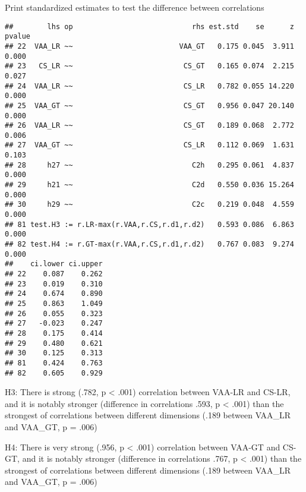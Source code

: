 \documentclass[
]{article}
\newenvironment{Shaded}{\begin{snugshade}}{\end{snugshade}}
\newcommand{\KeywordTok}[1]{\textcolor[rgb]{0.13,0.29,0.53}{\textbf{#1}}}
\newcommand{\NormalTok}[1]{#1}
\newcommand{\OperatorTok}[1]{\textcolor[rgb]{0.81,0.36,0.00}{\textbf{#1}}}
\newcommand{\StringTok}[1]{\textcolor[rgb]{0.31,0.60,0.02}{#1}}
\begin{document}
Print standardized estimates to test the difference between correlations

\begin{Shaded}
\end{Shaded}

\begin{verbatim}
##        lhs op                            rhs est.std    se      z pvalue
## 22  VAA_LR ~~                         VAA_GT   0.175 0.045  3.911  0.000
## 23   CS_LR ~~                          CS_GT   0.165 0.074  2.215  0.027
## 24  VAA_LR ~~                          CS_LR   0.782 0.055 14.220  0.000
## 25  VAA_GT ~~                          CS_GT   0.956 0.047 20.140  0.000
## 26  VAA_LR ~~                          CS_GT   0.189 0.068  2.772  0.006
## 27  VAA_GT ~~                          CS_LR   0.112 0.069  1.631  0.103
## 28     h27 ~~                            C2h   0.295 0.061  4.837  0.000
## 29     h21 ~~                            C2d   0.550 0.036 15.264  0.000
## 30     h29 ~~                            C2c   0.219 0.048  4.559  0.000
## 81 test.H3 := r.LR-max(r.VAA,r.CS,r.d1,r.d2)   0.593 0.086  6.863  0.000
## 82 test.H4 := r.GT-max(r.VAA,r.CS,r.d1,r.d2)   0.767 0.083  9.274  0.000
##    ci.lower ci.upper
## 22    0.087    0.262
## 23    0.019    0.310
## 24    0.674    0.890
## 25    0.863    1.049
## 26    0.055    0.323
## 27   -0.023    0.247
## 28    0.175    0.414
## 29    0.480    0.621
## 30    0.125    0.313
## 81    0.424    0.763
## 82    0.605    0.929
\end{verbatim}

H3: There is strong (.782, p \textless{} .001) correlation between
VAA-LR and CS-LR, and it is notably stronger (difference in correlations
.593, p \textless{} .001) than the strongest of correlations between
different dimensions (.189 between VAA\_LR and VAA\_GT, p = .006)

H4: There is very strong (.956, p \textless{} .001) correlation between
VAA-GT and CS-GT, and it is notably stronger (difference in correlations
.767, p \textless{} .001) than the strongest of correlations between
different dimensions (.189 between VAA\_LR and VAA\_GT, p = .006)
\end{document}
